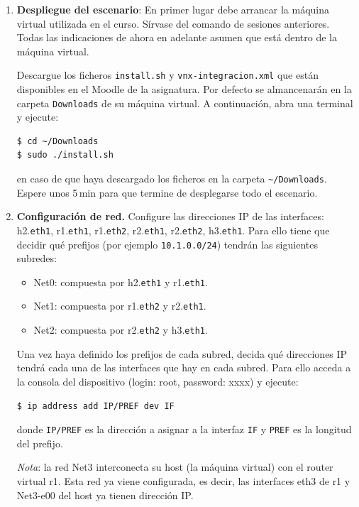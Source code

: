 \documentclass{upmassignment} \usepackage[spanish]{babel} \usepackage{ifthen} \usepackage{amsmath} \usepackage{amsfonts} \usepackage{booktabs}
\begin{document}
\begin{enumerate}[label=\textbf{Actividad {{\arabic*}}}]
    \item \textbf{Despliegue del escenario}: En primer lugar debe arrancar la máquina
virtual utilizada en el curso. Sírvase del comando de sesiones anteriores. Todas las indicaciones de ahora en adelante asumen que está dentro
de la máquina virtual.

Descargue los ficheros \texttt{install.sh} y \texttt{vnx-integracion.xml} que están disponibles en el Moodle de la asignatura. Por defecto se almancenarán en la carpeta \texttt{Downloads} de su máquina virtual. A continuación, abra una terminal y ejecute:
\begin{lstlisting}[language=bash]
$ cd ~/Downloads
$ sudo ./install.sh
\end{lstlisting}
en caso de que haya descargado los
ficheros en la carpeta
\texttt{\~{}/Downloads}.
Espere unos 5\,\textrm{min} para que
termine de desplegarse todo el escenario.

\item \textbf{Configuración de red.}  Configure las direcciones IP de las interfaces: 
h2.\texttt{eth1},
r1.\texttt{eth1},
r1.\texttt{eth2},
r2.\texttt{eth1},
r2.\texttt{eth2},
h3.\texttt{eth1}.
Para ello tiene que decidir qué prefijos
(por ejemplo \texttt{10.1.0.0/24})
tendrán las siguientes subredes:
\begin{itemize}
    \item Net0: compuesta por
        h2.\texttt{eth1} y
        r1.\texttt{eth1}.
    \item Net1: compuesta por
        r1.\texttt{eth2} y
        r2.\texttt{eth1}.
    \item Net2: compuesta por
        r2.\texttt{eth2} y
        h3.\texttt{eth1}.
\end{itemize}

Una vez haya definido los prefijos
de cada subred, decida qué direcciones
IP tendrá cada una de las interfaces que
hay en cada subred.
Para ello acceda a la consola del
dispositivo
(login: root, password: xxxx)
y ejecute:
\begin{lstlisting}[language=bash]
$ ip address add IP/PREF dev IF
\end{lstlisting}
donde \texttt{IP/PREF} es la dirección
a asignar a la interfaz \texttt{IF}
y \texttt{PREF} es la longitud del prefijo.

\emph{Nota}: la red Net3 interconecta
su host (la máquina virtual)
con el router virtual r1.
Esta red ya viene configurada, es decir, las interfaces eth3 de r1 y Net3-e00 del host ya tienen dirección IP.



\end{enumerate}
\end{document}
